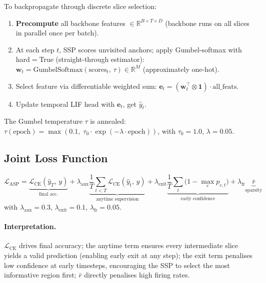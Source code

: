 \documentclass[11pt,a4paper]{article}
\begin{document}
To backpropagate through discrete slice selection:
\begin{enumerate}
  \item \textbf{Precompute} all backbone features $\in \mathbb{R}^{B \times T \times D}$
        (backbone runs on all slices in parallel once per batch).
  \item At each step $t$, SSP scores unvisited anchors; apply Gumbel-softmax with
        hard$=$True (straight-through estimator):
        $\mathbf{w}_t = \text{GumbelSoftmax}(\text{scores}_t,\, \tau) \in \mathbb{R}^M$
        (approximately one-hot).
  \item Select feature via differentiable weighted sum:
        $\mathbf{e}_t = (\mathbf{w}_t^\top \otimes \mathbf{1}) \cdot \text{all\_feats}$.
  \item Update temporal LIF head with $\mathbf{e}_t$, get $\hat{y}_t$.
\end{enumerate}
The Gumbel temperature $\tau$ is annealed:
$\tau(\text{epoch}) = \max(0.1,\; \tau_0 \cdot \exp(-\lambda \cdot \text{epoch}))$,
with $\tau_0{=}1.0$, $\lambda{=}0.05$.

\subsection{Joint Loss Function}

\begin{equation}
  \mathcal{L}_\text{ASP}
  = \underbrace{\mathcal{L}_\text{CE}(\hat{y}_T,\, y)}_{\text{final acc.}}
  + \lambda_\text{aux} \underbrace{\frac{1}{T}\sum_{t<T} \mathcal{L}_\text{CE}(\hat{y}_t,\, y)}_{\text{anytime supervision}}
  + \lambda_\text{exit} \underbrace{\frac{1}{T}\sum_t \bigl(1 - \max_c p_{c,t}\bigr)}_{\text{early confidence}}
  + \lambda_\text{fr} \underbrace{\bar{r}}_{\text{sparsity}}
  \label{eq:asp_loss}
\end{equation}
with $\lambda_\text{aux}{=}0.3$, $\lambda_\text{exit}{=}0.1$,
$\lambda_\text{fr}{=}0.05$.

\paragraph{Interpretation.}
$\mathcal{L}_\text{CE}$ drives final accuracy; the anytime term ensures every
intermediate slice yields a valid prediction (enabling early exit at any step);
the exit term penalises low confidence at early timesteps, encouraging the SSP
to select the most informative region first; $\bar{r}$ directly penalises high
firing rates.
\end{document}
